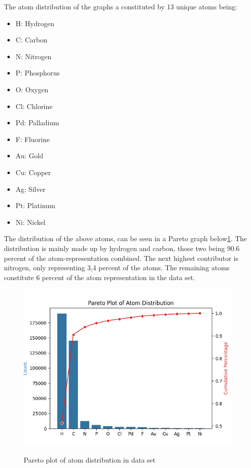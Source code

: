 The atom distribution of the graphs a constituted by 13 unique atoms being:
 \begin{itemize}  
 \item H: Hydrogen  
 \item C: Carbon  
 \item N: Nitrogen  
 \item P: Phosphorus  
 \item O: Oxygen  
 \item Cl: Chlorine  
 \item Pd: Palladium  
 \item F: Fluorine  
 \item Au: Gold  
 \item Cu: Copper  
 \item Ag: Silver  
 \item Pt: Platinum  
 \item Ni: Nickel 
 \end{itemize}

The distribution of the above atoms, can be seen in a Pareto graph below\ref{pareto_atoms}. 
The distribution is mainly made up by hydrogen and carbon, those two being 90.6 percent of the atom-representation combined. 
The next highest contributor is nitrogen, only representing 3,4 percent of the atoms. 
The remaining atoms constitute 6 percent of the atom representation in the data set.

\begin{figure}[H]
\caption{Pareto plot of atom distribution in data set}
\centering\label{pareto_atoms}
\includegraphics[width=\textwidth]{Images/Data/pareto_atom_distribution.png}
\end{figure}

